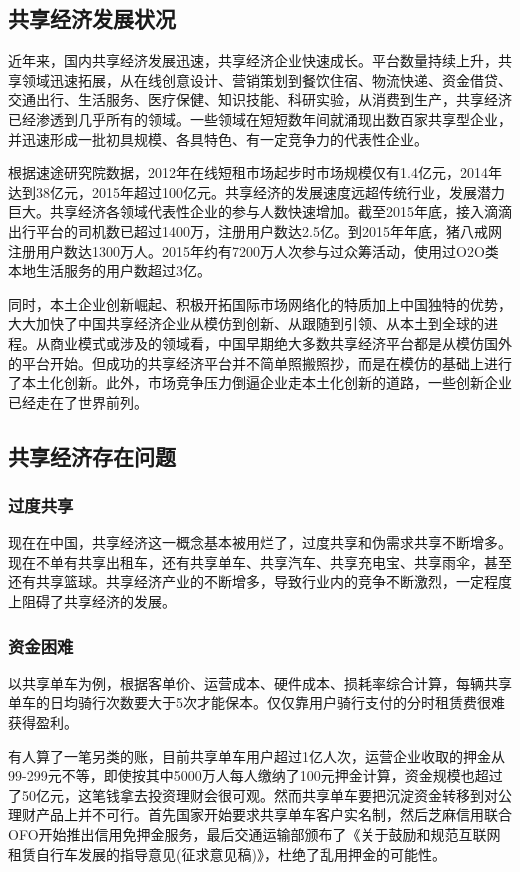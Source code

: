 \documentclass[a4paper,oneside,12pt]{article}
\begin{document}
\subsection{共享经济发展状况}
近年来，国内共享经济发展迅速，共享经济企业快速成长。平台数量持续上升，共享领域迅速拓展，从在线创意设计、营销策划到餐饮住宿、物流快递、资金借贷、交通出行、生活服务、医疗保健、知识技能、科研实验，从消费到生产，共享经济已经渗透到几乎所有的领域。一些领域在短短数年间就涌现出数百家共享型企业，并迅速形成一批初具规模、各具特色、有一定竞争力的代表性企业。

根据速途研究院数据，2012年在线短租市场起步时市场规模仅有1.4亿元，2014年达到38亿元，2015年超过100亿元。共享经济的发展速度远超传统行业，发展潜力巨大。共享经济各领域代表性企业的参与人数快速增加。截至2015年底，接入滴滴出行平台的司机数已超过1400万，注册用户数达2.5亿。到2015年年底，猪八戒网注册用户数达1300万人。2015年约有7200万人次参与过众筹活动，使用过O2O类本地生活服务的用户数超过3亿。

同时，本土企业创新崛起、积极开拓国际市场网络化的特质加上中国独特的优势，大大加快了中国共享经济企业从模仿到创新、从跟随到引领、从本土到全球的进程。从商业模式或涉及的领域看，中国早期绝大多数共享经济平台都是从模仿国外的平台开始。但成功的共享经济平台并不简单照搬照抄，而是在模仿的基础上进行了本土化创新。此外，市场竞争压力倒逼企业走本土化创新的道路，一些创新企业已经走在了世界前列。


\subsection{共享经济存在问题}
\subsubsection{过度共享}
现在在中国，共享经济这一概念基本被用烂了，过度共享和伪需求共享不断增多。现在不单有共享出租车，还有共享单车、共享汽车、共享充电宝、共享雨伞，甚至还有共享篮球。共享经济产业的不断增多，导致行业内的竞争不断激烈，一定程度上阻碍了共享经济的发展。

\subsubsection{资金困难}
以共享单车为例，根据客单价、运营成本、硬件成本、损耗率综合计算，每辆共享单车的日均骑行次数要大于5次才能保本。仅仅靠用户骑行支付的分时租赁费很难获得盈利。

有人算了一笔另类的账，目前共享单车用户超过1亿人次，运营企业收取的押金从99-299元不等，即使按其中5000万人每人缴纳了100元押金计算，资金规模也超过了50亿元，这笔钱拿去投资理财会很可观。然而共享单车要把沉淀资金转移到对公理财产品上并不可行。首先国家开始要求共享单车客户实名制，然后芝麻信用联合OFO开始推出信用免押金服务，最后交通运输部颁布了《关于鼓励和规范互联网租赁自行车发展的指导意见(征求意见稿)》，杜绝了乱用押金的可能性。
\end{document}
